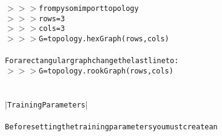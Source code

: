 {{\begin{tabbing}
{\texttt{$>$$>$$>$\hspace{6pt}from\hspace{6pt}pysom\hspace{6pt}import\hspace{6pt}topology}}\\
{\texttt{$>$$>$$>$\hspace{6pt}rows\hspace{6pt}=\hspace{6pt}3}}\\
{\texttt{$>$$>$$>$\hspace{6pt}cols\hspace{6pt}=\hspace{6pt}3}}\\
{\texttt{$>$$>$$>$\hspace{6pt}G\hspace{6pt}=\hspace{6pt}topology.hexGraph(rows,cols)}}\\
\\
{\texttt{For\hspace{6pt}a\hspace{6pt}rectangular\hspace{6pt}graph\hspace{6pt}change\hspace{6pt}the\hspace{6pt}last\hspace{6pt}line\hspace{6pt}to:}}\\
{\texttt{$>$$>$$>$\hspace{6pt}G\hspace{6pt}=\hspace{6pt}topology.rookGraph(rows,cols)}}\\
\\
{\texttt{\dash{}\dash{}\dash{}\dash{}\dash{}\dash{}\dash{}\dash{}\dash{}\dash{}\dash{}\dash{}\dash{}\dash{}\dash{}\dash{}\dash{}\dash{}\dash{}\dash{}\dash{}\dash{}\dash{}}}\\
{\texttt{$|$\hspace{6pt}Training\hspace{6pt}Parameters\hspace{6pt}$|$}}\\
{\texttt{\dash{}\dash{}\dash{}\dash{}\dash{}\dash{}\dash{}\dash{}\dash{}\dash{}\dash{}\dash{}\dash{}\dash{}\dash{}\dash{}\dash{}\dash{}\dash{}\dash{}\dash{}\dash{}\dash{}}}\\
{\texttt{Before\hspace{6pt}setting\hspace{6pt}the\hspace{6pt}training\hspace{6pt}parameters\hspace{6pt}you\hspace{6pt}must\hspace{6pt}create\hspace{6pt}an}}\\

\end{tabbing}}}
